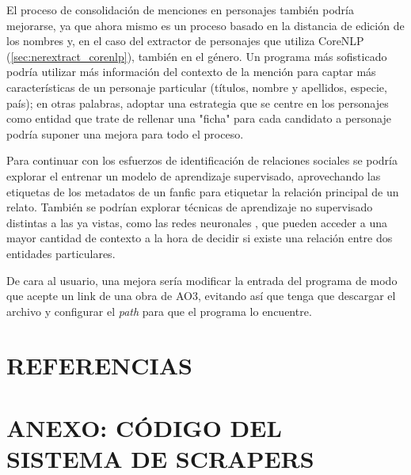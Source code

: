\documentclass{pre-tfg}
\begin{document}
El proceso de consolidación de menciones en personajes también podría mejorarse, ya que ahora mismo es un proceso basado en la distancia de edición de los nombres y, en el caso del extractor de personajes que utiliza CoreNLP (\ref{sec:nerextract_corenlp}), también en el género. Un programa más sofisticado podría utilizar más información del contexto de la mención para captar más características de un personaje particular (títulos, nombre y apellidos, especie, país); en otras palabras, adoptar una estrategia que se centre en los personajes como entidad \cite{wick_2009} que trate de rellenar una "ficha" para cada candidato a personaje podría suponer una mejora para todo el proceso.

Para continuar con los esfuerzos de identificación de relaciones sociales se podría explorar el entrenar un modelo de aprendizaje supervisado, aprovechando las etiquetas de los metadatos de un fanfic para etiquetar la relación principal de un relato. También se podrían explorar técnicas de aprendizaje no supervisado distintas a las ya vistas, como las redes neuronales \cite{peng_17}, que pueden acceder a una mayor cantidad de contexto a la hora de decidir si existe una relación entre dos entidades particulares.

De cara al usuario, una mejora sería modificar la entrada del programa de modo que acepte un link de una obra de AO3, evitando así que tenga que descargar el archivo y configurar el \textit{path} para que el programa lo encuentre.

\cleardoublepage
\section{REFERENCIAS}
%

\singlespacing



\cleardoublepage

\appendix
\section{ANEXO: CÓDIGO DEL SISTEMA DE SCRAPERS}
\label{an:scrapers}
\end{document}
